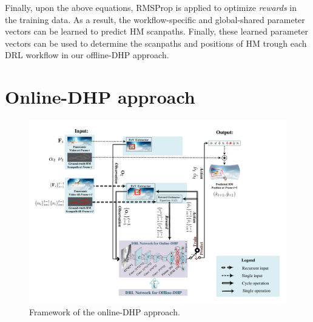 \documentclass[10pt,journal,compsoc]{IEEEtran}
\begin{document}
Finally, upon the above equations, RMSProp \cite{tieleman2012lecture} is applied to optimize \textit{rewards} in the training data. As a result, the workflow-specific and global-shared parameter vectors can be learned to predict HM scanpaths.
Finally, these learned parameter vectors can be used to determine the scanpaths and positions of HM trough each DRL workflow in our offline-DHP approach.

\section{Online-DHP approach}

\begin{figure}
\vspace{-2em}
	\begin{center}
		\centerline{\includegraphics[width=\columnwidth]{figures/dhp_approach_on_line/whole_framework_online_5}}%
       \vspace{-1em}
		\caption{\footnotesize{Framework of the online-DHP approach.}}
		\label{online-framework}
	\end{center}
\vspace{-2em}
\end{figure}
\end{document}

